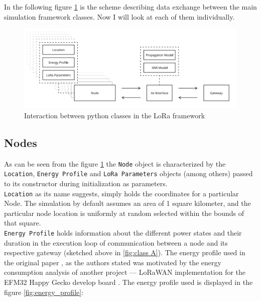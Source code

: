 In the following figure \ref{fig:architecture} is the scheme describing data exchange between the main
simulation framework classes. Now I will look at each of them individually.

\begin{figure}[H]
  \centering
  \includegraphics[scale=0.6]{figures/architecture.PNG}
  \caption{Interaction between python classes in the LoRa framework \cite{simulator}}
  \label{fig:architecture}
\end{figure}

\subsection{Nodes}

As can be seen from the figure \ref{fig:architecture} the \texttt{Node} object is characterized by the \texttt{Location}, \texttt{Energy Profile} and \texttt{LoRa Parameters} objects (among others) passed to its constructor during initialization as parameters.\\

\texttt{Location} as its name suggests, simply holds the coordinates for a particular Node. The simulation by default assumes an area of 1 square kilometer, and the particular node location is uniformly at random selected within the bounds of that square. \\

\texttt{Energy Profile} holds information about the different power states and their duration in the execution loop of communication between a node and its respective gateway (sketched above in \ref{fig:class A}). The energy profile used in the original paper \cite{simulator}, as the authors stated was motivated by the energy consumption analysis of another project — LoRaWAN implementation for the EFM32 Happy Gecko develop board \cite{energy_profile}. The energy profile used is displayed in the figure 
\ref{fig:energy_profile}:

